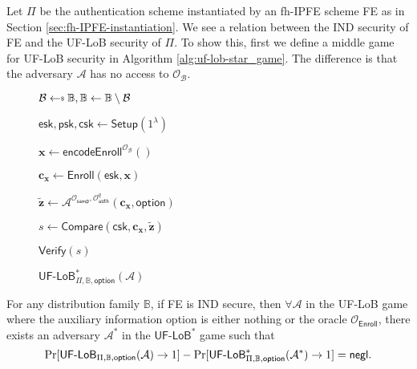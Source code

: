 Let $\Pi$ be the authentication scheme instantiated by an fh-IPFE scheme \textsf{FE} as in Section \ref{sec:fh-IPFE-instantiation}.
We see a relation between the IND security of \textsf{FE} and the UF-LoB security of $\Pi$.
To show this, first we define a middle game for UF-LoB security in Algorithm \ref{alg:uf-lob-star_game}. The difference is that the adversary $\mathcal{A}$ has no access to $\mathcal{O}_\mathcal{B}$.

\begin{figure}[h]
\centering
	
	\begin{minipage}[t]{0.5\linewidth}
	\centering
	\begin{algorithm}[H]
	\caption{$\textsf{UF-LoB}^*_{\Pi, \mathbb{B}, \textsf{option}}(\mathcal{A})$}
	\label{alg:uf-lob-star_game}
	\begin{algorithmic}[1]
		\State $\mathcal{B} \getsdollar \mathbb{B}, \mathbb{B} \gets \mathbb{B} \setminus \mathcal{B}$

		\State $\textsf{esk}, \textsf{psk}, \textsf{csk} \gets \textsf{Setup}(1^\lambda)$

		\State $\mathbf{x} \gets \textsf{encodeEnroll}^{\mathcal{O}_{\mathcal{B}}}()$

		\State $\mathbf{c_x} \gets \textsf{Enroll}(\textsf{esk}, \mathbf{x})$

		\State ${\mathbf{\tilde{z}}} \gets \mathcal{A}^{\mathcal{O}_\textsf{samp}, \mathcal{O}_\textsf{auth}^q } ( \mathbf{c_x}, \textsf{option})$

		\State $s \gets \textsf{Compare}( \textsf{csk}, \mathbf{c_x}, \mathbf{\tilde{z}} )$

		\State \Return $\textsf{Verify}(s)$
	\end{algorithmic}
	\end{algorithm}
	\end{minipage}
	
\label{fig:uf-lob-star_game}
\end{figure}


\begin{theorem}
\label{thm:ind-uf-lob1}

	For any distribution family $\mathbb{B}$, if \textsf{FE} is IND secure, then $\forall \mathcal{A}$ in the \textsf{UF-LoB} game where the auxiliary information \textsf{option} is either nothing or the oracle $\mathcal{O}_{\textsf{Enroll}}$, there exists an adversary $\mathcal{A}^*$ in the $\textsf{UF-LoB}^*$ game such that
	\[
		\Pr[\textsf{UF-LoB}_{\Pi, \mathbb{B}, \textsf{option}}(\mathcal{A}) \to 1] - \Pr[\textsf{UF-LoB}^*_{\Pi, \mathbb{B}, \textsf{option}}(\mathcal{A}^*) \to 1] = \mathsf{negl}.
	\]

\end{theorem}


